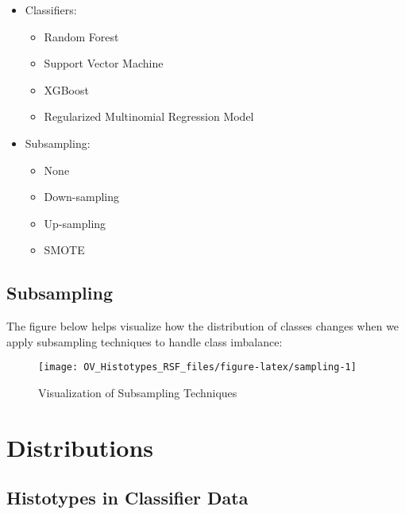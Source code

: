 \documentclass[
]{report}
\providecommand{\tightlist}{%
  \setlength{\itemsep}{0pt}\setlength{\parskip}{0pt}}
\begin{document}
\begin{itemize}
\item
  Classifiers:

  \begin{itemize}
  \tightlist
  \item
    Random Forest
  \item
    Support Vector Machine
  \item
    XGBoost
  \item
    Regularized Multinomial Regression Model
  \end{itemize}
\item
  Subsampling:

  \begin{itemize}
  \tightlist
  \item
    None
  \item
    Down-sampling
  \item
    Up-sampling
  \item
    SMOTE
  \end{itemize}
\end{itemize}

\hypertarget{subsampling}{%
\section{Subsampling}\label{subsampling}}

The figure below helps visualize how the distribution of classes changes when we apply subsampling techniques to handle class imbalance:

\begin{figure}[H]

{\centering \texttt{[image: OV\_Histotypes\_RSF\_files/figure-latex/sampling-1]} 

}

\caption{Visualization of Subsampling Techniques}\label{fig:sampling}
\end{figure}

\hypertarget{distributions}{%
\chapter{Distributions}\label{distributions}}

\hypertarget{histotypes-in-classifier-data}{%
\section{Histotypes in Classifier Data}\label{histotypes-in-classifier-data}}
\end{document}

